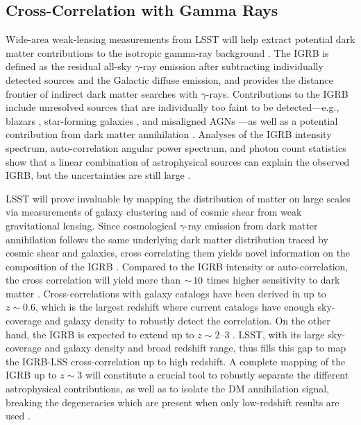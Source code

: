 \subsection{Cross-Correlation with Gamma Rays }
\label{sec:igrb_id}

Wide-area weak-lensing measurements from LSST will help extract  potential dark matter contributions to the isotropic gamma-ray background \citep[IGRB;][]{1410.3696}. The IGRB is defined as the residual all-sky $\gamma$-ray emission after subtracting individually detected sources and the Galactic diffuse emission, and provides the distance frontier of indirect dark matter searches with $\gamma$-rays. Contributions to the IGRB include unresolved sources that are individually too faint to be detected---e.g., blazars \citep{1110.3787,1310.0006}, star-forming galaxies \citep{1206.1346}, and misaligned AGNs \citep{1304.0908}---as well as a potential contribution from dark matter annihilation \citep{1312.0608,1501.05464,1501.05301,1608.07289}. Analyses of the IGRB intensity spectrum, auto-correlation angular power spectrum, and photon count statistics show that a linear combination of astrophysical sources can explain the observed IGRB, but the uncertainties are still large \citep[e.g.,][]{1502.02866}.

LSST will prove invaluable by mapping the distribution of matter on large scales via measurements of galaxy clustering and of cosmic shear from weak gravitational lensing. 
Since  cosmological $\gamma$-ray emission from dark matter annihilation follows the same underlying dark matter distribution traced by cosmic shear and galaxies, cross correlating them yields novel information on the composition of the IGRB \citep{1212.5018,1312.4403,1411.4651,1506.01030,Lisanti:2018}. 
Compared to the IGRB intensity or auto-correlation, the cross correlation will yield more than $ {\sim}\, 10$ times higher sensitivity to dark matter \citep{1411.4651,1503.05922}.
Cross-correlations with galaxy catalogs have been derived in \cite{1103.4861,1503.05918,1709.01940} up to $z \sim 0.6$, 
which is the largest redshift where current catalogs have enough sky-coverage and galaxy density to robustly
detect the correlation.  On the other hand, the IGRB is expected to extend up to $z \sim 2$--$3$ \citep{1502.02866}. 
LSST, with its large sky-coverage and galaxy density and broad redshift range, thus fills this gap to map the IGRB-LSS cross-correlation up to high redshift. 
A complete mapping of the IGRB up to $z \sim 3$ will constitute a crucial tool to robustly separate the different 
astrophysical contributions, as well as to isolate the DM annihilation signal, breaking the degeneracies which
are present when only low-redshift results are used \citep{1506.01030}.    

